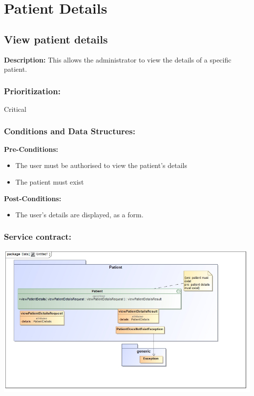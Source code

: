 \section{Patient Details}


\subsection{View patient details}
\textbf{Description:}
This allows the administrator to view the details of a specific patient.
\subsubsection{Prioritization:}
Critical
\subsubsection{Conditions and Data Structures:}
\textbf{Pre-Conditions:}
\begin{itemize}
	\item The user must be authorised to view the patient's details
	\item The patient must exist
\end{itemize}

\textbf{Post-Conditions:}	
\begin{itemize}
	\item The user's details are displayed, as a form.
\end{itemize}

\subsubsection{Service contract:}
\includegraphics[width=1\linewidth]{./Graphics/1.jpg}
